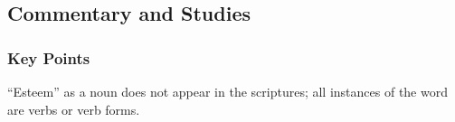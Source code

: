 	


	
	
	
	
\subsection{Commentary and Studies} %
	\label{ESTEEM-COMMENTARY}

	\subsubsection{Key Points}
		\label{ESTEEM-KEYS}
	
		\begin{compactitem}
			\item ``Esteem'' as a noun does not appear in the scriptures; all instances of the word are verbs or verb forms.
		\end{compactitem}
		
